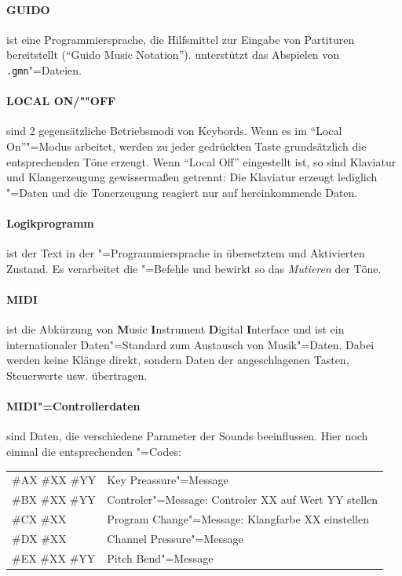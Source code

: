 {\paragraph{GUIDO}\label{sec:DV_GUIDO} ist eine
  Programmiersprache, die Hilfsmittel zur Eingabe von Partituren
  bereitstellt ("`Guido Music Notation"'). \mutabor{} unterstützt das
  Abspielen von \texttt{.gmn}"=Dateien.

\paragraph{LOCAL ON/""OFF}\label{sec:DV_LOCAL} sind 2
  gegensätzliche Betriebsmodi von Keybords. Wenn es im "`Local
  On"'"=Modus arbeitet, werden zu jeder gedrückten Taste grundsätzlich
  die entsprechenden Töne erzeugt. Wenn "`Local Off"' eingestellt ist,
  so sind Klaviatur und Klangerzeugung gewissermaßen getrennt: Die
  Klaviatur erzeugt lediglich "=Daten und
  die Tonerzeugung reagiert nur auf hereinkommende Daten.

\paragraph{Logikprogramm}\label{sec:DV_LOGIKPROGRAMM} ist der
  Text in der \mutabor{}"=Programmiersprache in übersetztem und
  Aktivierten Zustand. Es verarbeitet die
  "=Befehle und bewirkt so das
  \emph{Mutieren} der Töne.

\paragraph{MIDI}\label{sec:DV_MIDI} ist die Abkürzung von
  \textbf{M}usic \textbf{I}nstrument \textbf{D}igital
  \textbf{I}nterface und ist ein internationaler Daten"=Standard zum
  Austausch von Musik"=Daten. Dabei werden keine Klänge direkt,
  sondern Daten der angeschlagenen Tasten, Steuerwerte usw.
  übertragen.

\paragraph{MIDI"=Controllerdaten}\label{sec:DV_MIDICON} sind
  Daten, die verschiedene Parameter der Sounds beeinflussen.  Hier noch
  einmal die entsprechenden "=Codes:

  \begin{tabular}{l@{ \dots }l}
    \#AX \#XX \#YY&Key Preassure"=Message\\
    \#BX \#XX \#YY&Controler"=Message: Controler XX auf Wert YY stellen\\
    \#CX \#XX&Program Change"=Message: Klangfarbe XX einstellen\\
    \#DX \#XX&Channel Pressure"=Message\\
    \#EX \#XX \#YY&Pitch Bend"=Message
  \end{tabular}

}

